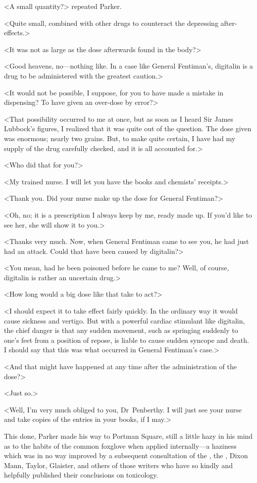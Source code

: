 <A small quantity?> repeated Parker.

<Quite small, combined with other drugs to counteract the depressing after-effects.>

<It was not as large as the dose afterwards found in the body?>

<Good heavens, no—nothing like. In a case like General Fentiman's, digitalin is a drug to be administered with the greatest caution.>

<It would not be possible, I suppose, for you to have made a mistake in dispensing? To have given an over-dose by error?>

<That possibility occurred to me at once, but as soon as I heard Sir James Lubbock's figures, I realized that it was quite out of the question. The dose given was enormous; nearly two grains. But, to make quite certain, I have had my supply of the drug carefully checked, and it is all accounted for.>

<Who did that for you?>

<My trained nurse. I will let you have the books and chemists' receipts.>

<Thank you. Did your nurse make up the dose for General Fentiman?>

<Oh, no; it is a prescription I always keep by me, ready made up. If you'd like to see her, she will show it to you.>

<Thanks very much. Now, when General Fentiman came to see you, he had just had an attack. Could that have been caused by digitalin?>

<You mean, had he been poisoned before he came to me? Well, of course, digitalin is rather an uncertain drug.>

<How long would a big dose like that take to act?>

<I should expect it to take effect fairly quickly. In the ordinary way it would cause sickness and vertigo. But with a powerful cardiac stimulant like digitalin, the chief danger is that any sudden movement, such as springing suddenly to one's feet from a position of repose, is liable to cause sudden syncope and death. I should say that this was what occurred in General Fentiman's case.>

<And that might have happened at any time after the administration of the dose?>

<Just so.>

<Well, I'm very much obliged to you, Dr~Penberthy. I will just see your nurse and take copies of the entries in your books, if I may.>

This done, Parker made his way to Portman Square, still a little hazy in his mind as to the habits of the common foxglove when applied internally—a haziness which was in no way improved by a subsequent consultation of the , the , Dixon Mann, Taylor, Glaister, and others of those writers who have so kindly and helpfully published their conclusions on toxicology.